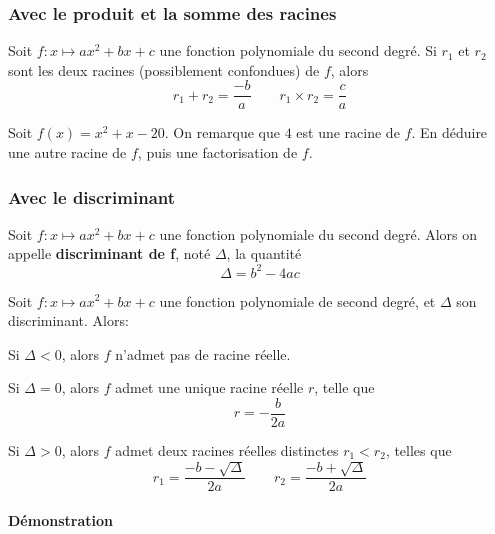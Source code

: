 \documentclass{article}
\begin{document}
\subsubsection{Avec le produit et la somme des racines}
\begin{proposition}
Soit $f : x \mapsto ax^2 + bx + c$ une fonction polynomiale du second degré. Si $r_1$ et $r_2$ sont les deux racines (possiblement confondues) de $f$, alors
\begin{equation*}
r_1 + r_2 = \dfrac{-b}{a} \qquad r_1 \times r_2 = \dfrac{c}{a}
\end{equation*}
\end{proposition}
\begin{example}
Soit $f(x) = x^2 + x - 20$. On remarque que $4$ est une racine de $f$. En déduire une autre racine de $f$, puis une factorisation de $f$.
\vspace*{0.5cm}

\emptybox{3cm}
\end{example}
\newpage
\subsubsection{Avec le discriminant}
\begin{tcolorbox}
\begin{definition}
Soit $f : x \mapsto ax^2 + bx + c$ une fonction polynomiale du second degré. Alors on appelle \textbf{discriminant de f}, noté $\Delta$, la quantité
\begin{equation*}
\Delta = b^2 - 4ac
\end{equation*} 
\end{definition}
\end{tcolorbox}
\begin{theorem}
Soit $f : x \mapsto ax^2 + bx + c$ une fonction polynomiale de second degré, et $\Delta$ son discriminant. Alors:
\begin{enumquestions}
\item Si $\Delta < 0$, alors $f$ n'admet pas de racine réelle.
\item Si $\Delta = 0$, alors $f$ admet une unique racine réelle $r$, telle que
\begin{equation*}
r = - \dfrac{b}{2a}
\end{equation*}
\item Si $\Delta > 0$, alors $f$ admet deux racines réelles distinctes $r_1 < r_2$, telles que
\begin{equation*}
r_1 = \dfrac{- b - \sqrt{\Delta}}{2a} \qquad r_2 = \dfrac{- b + \sqrt{\Delta}}{2a}
\end{equation*}
\end{enumquestions}
\end{theorem}
\paragraph{Démonstration}
\hfill
\vspace*{0.2cm}

\emptybox{15cm}
\end{document}
